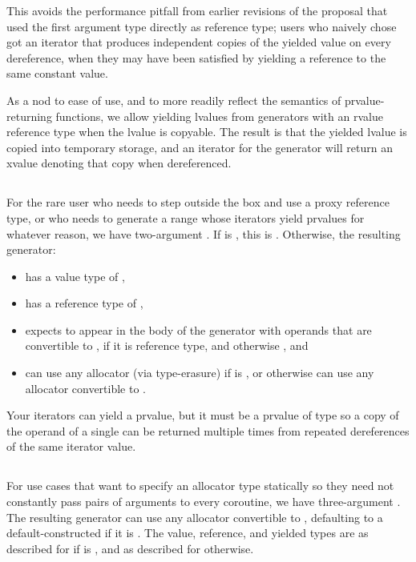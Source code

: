 \documentclass{wg21}
\begin{document}
This avoids the performance pitfall from
earlier revisions of the proposal
that used the first argument type directly as reference type;
users who naively chose 
got an iterator that produces independent copies
of the yielded value on every dereference,
when they may have been satisfied by
yielding a reference to the same constant value.

As a nod to ease of use, and to more readily reflect the semantics of
prvalue-returning functions, we allow yielding lvalues from generators
with an rvalue reference type when the lvalue is copyable. The result is that
the yielded lvalue is copied into temporary storage, and an iterator for the
generator will return an xvalue denoting that copy when dereferenced.

\subsection{}
For the rare user who needs 
to step outside the box and use a proxy reference type,
or who needs to generate a range whose iterators yield
prvalues for whatever reason, we have two-argument .
If  is , this is .
Otherwise, the resulting generator:
\begin{itemize}
\item has a value type of ,
\item has a reference type of ,
\item expects  to appear in the body of the generator
  with operands that are convertible to , if it is reference type,
  and otherwise , and
\item can use any allocator (via type-erasure) if  is ,
  or otherwise can use any allocator convertible to .
\end{itemize}
Your iterators can yield a prvalue, but
it must be a prvalue of  type so a copy of
the operand of a single  can be returned multiple times
from repeated dereferences of the same iterator value.

\subsection{}
For use cases that want to specify an allocator type statically
so they need not constantly pass pairs of
 arguments to every coroutine,
we have three-argument .
The resulting generator can use any allocator convertible to ,
defaulting to a default-constructed 
if it is .
The value, reference, and yielded types are
as described for 
if  is , and
as described for  otherwise.
\end{document}
